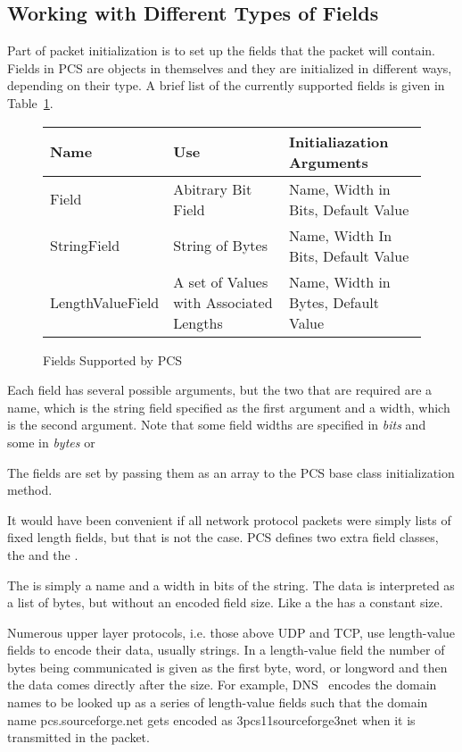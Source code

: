 \documentclass[11pt]{article}
\begin{document}
\subsection{Working with Different Types of Fields}
\label{sec:working_with_different_types_of_fields}

Part of packet initialization is to set up the fields that the packet
will contain.  Fields in PCS are objects in themselves and they are
initialized in different ways, depending on their type.  A brief list
of the currently supported fields is given in
Table~\ref{fig:fields_supported_by_pcs}.

\begin{figure}
  \centering
  \begin{tabular}{|l|l|l|}
    \hline
    Name & Use & Initialiazation Arguments\\
    \hline
    Field & Abitrary Bit Field & Name, Width in Bits, Default Value\\
    \hline
    StringField & String of Bytes & Name, Width In Bits, Default Value\\
    \hline
    LengthValueField & A set of Values with Associated Lengths & Name,
    Width in Bytes, Default Value\\
    \hline
  \end{tabular}
  \caption{Fields Supported by PCS}
  \label{fig:fields_supported_by_pcs}
\end{figure}

Each field has several possible arguments, but the two that are
required are a name, which is the string field specified as the first
argument and a width, which is the second argument.  Note that some
field widths are specified in \emph{bits} and some in \emph{bytes} or

The fields are set by passing them as an array to the PCS base class
initialization method.

It would have been convenient if all network protocol packets were
simply lists of fixed length fields, but that is not the case.  PCS
defines two extra field classes, the  and the
.

The  is simply a name and a width in bits of the
string.  The data is interpreted as a list of bytes, but without an
encoded field size.  Like a  the  has
a constant size.

Numerous upper layer protocols, i.e. those above UDP and TCP, use
length-value fields to encode their data, usually strings.  In a
length-value field the number of bytes being communicated is given as
the first byte, word, or longword and then the data comes directly
after the size.  For example, DNS~\cite{rfc1035} encodes the domain
names to be looked up as a series of length-value fields such that the
domain name pcs.sourceforge.net gets encoded as 3pcs11sourceforge3net
when it is transmitted in the packet.
\end{document}
